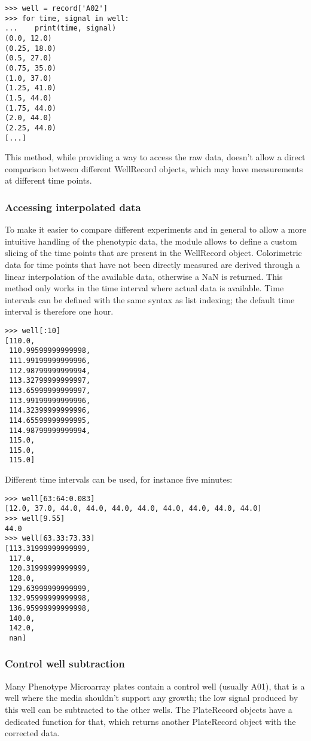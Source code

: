 \begin{verbatim}
>>> well = record['A02']
>>> for time, signal in well:
...    print(time, signal)
(0.0, 12.0)
(0.25, 18.0)
(0.5, 27.0)
(0.75, 35.0)
(1.0, 37.0)
(1.25, 41.0)
(1.5, 44.0)
(1.75, 44.0)
(2.0, 44.0)
(2.25, 44.0)
[...]
\end{verbatim}

This method, while providing a way to access the raw data, doesn't allow a direct
comparison between different WellRecord objects, which may have measurements at
different time points.

\subsubsection{Accessing interpolated data}
To make it easier to compare different experiments and in general to allow a more intuitive handling
of the phenotypic data, the module allows to define a custom slicing of the time points that are present
in the WellRecord object. Colorimetric data for time points that have not been directly measured are
derived through a linear interpolation of the available data, otherwise a NaN is returned.
This method only works in the time interval where actual data is available.
Time intervals can be defined with the same syntax as list
indexing; the default time interval is therefore one hour.

\begin{verbatim}
>>> well[:10]
[110.0,
 110.99599999999998,
 111.99199999999996,
 112.98799999999994,
 113.32799999999997,
 113.65999999999997,
 113.99199999999996,
 114.32399999999996,
 114.65599999999995,
 114.98799999999994,
 115.0,
 115.0,
 115.0]
\end{verbatim}

Different time intervals can be used, for instance five minutes:
\begin{verbatim}
>>> well[63:64:0.083]
[12.0, 37.0, 44.0, 44.0, 44.0, 44.0, 44.0, 44.0, 44.0, 44.0]
>>> well[9.55]
44.0
>>> well[63.33:73.33]
[113.31999999999999,
 117.0,
 120.31999999999999,
 128.0,
 129.63999999999999,
 132.95999999999998,
 136.95999999999998,
 140.0,
 142.0,
 nan]
\end{verbatim}

\subsubsection{Control well subtraction}
Many Phenotype Microarray plates contain a control well (usually A01), that is a well where the media shouldn't support
any growth; the low signal produced by this well can be subtracted to the other wells.
The PlateRecord objects have a dedicated function for that, which returns another PlateRecord object
with the corrected data.

